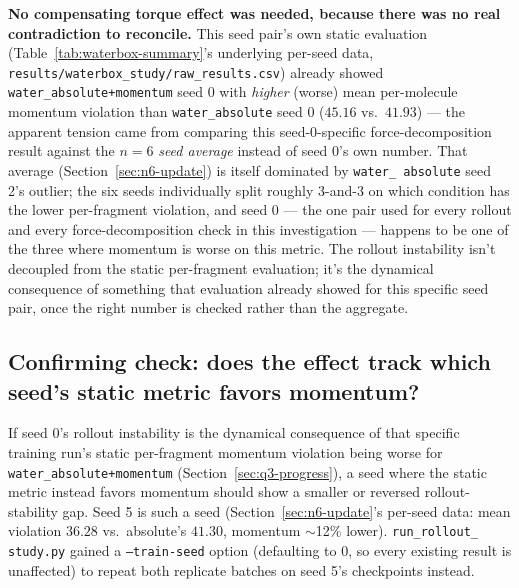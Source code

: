 \documentclass[11pt]{article}
\begin{document}
\textbf{No compensating torque effect was needed, because there was no real
contradiction to reconcile.} This seed pair's own static evaluation
(Table~\ref{tab:waterbox-summary}'s underlying per-seed data,
\texttt{results/waterbox\_study/raw\_results.csv}) already showed
\texttt{water\_absolute+momentum} seed 0 with \emph{higher} (worse) mean
per-molecule momentum violation than \texttt{water\_absolute} seed 0
($45.16$ vs.\ $41.93$) --- the apparent tension came from comparing this
seed-0-specific force-decomposition result against the $n{=}6$ \emph{seed
average} instead of seed 0's own number. That average
(Section~\ref{sec:n6-update}) is itself dominated by \texttt{water\_
absolute} seed 2's outlier; the six seeds individually split roughly
3-and-3 on which condition has the lower per-fragment violation, and seed 0
--- the one pair used for every rollout and every force-decomposition check
in this investigation --- happens to be one of the three where momentum is
worse on this metric. The rollout instability isn't decoupled from the
static per-fragment evaluation; it's the dynamical consequence of something
that evaluation already showed for this specific seed pair, once the right
number is checked rather than the aggregate.

\subsection{Confirming check: does the effect track which seed's static
metric favors momentum?}
\label{sec:q3-seed5}

If seed 0's rollout instability is the dynamical consequence of that
specific training run's static per-fragment momentum violation being worse
for \texttt{water\_absolute+momentum} (Section~\ref{sec:q3-progress}), a
seed where the static metric instead favors momentum should show a smaller
or reversed rollout-stability gap. Seed 5 is such a seed
(Section~\ref{sec:n6-update}'s per-seed data: mean violation $36.28$
vs.\ absolute's $41.30$, momentum $\sim$12\% lower). \texttt{run\_rollout\_
study.py} gained a \texttt{--train-seed} option (defaulting to 0, so every
existing result is unaffected) to repeat both replicate batches on seed 5's
checkpoints instead.
\end{document}
